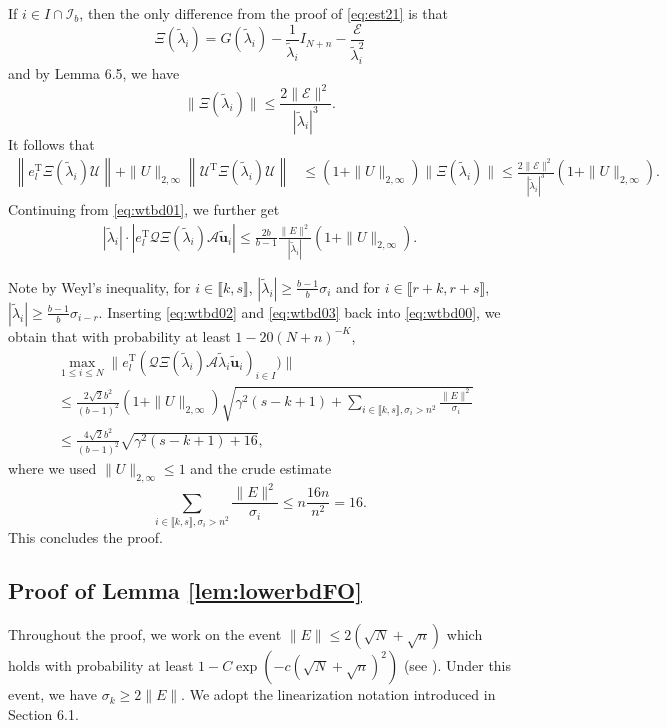 \documentclass[reqno]{amsart}
\newcommand{\T}{\mathrm{T}}
\theoremstyle{plain}
\theoremstyle{definition}
\begin{document}
If $i\in I \cap \mathcal I_b$, then the only difference from the proof of \eqref{eq:est21} is that $$\Xi(\widetilde \lambda_i)=G(\widetilde \lambda_i)-\frac{1}{\widetilde \lambda_i} I_{N+n}-\frac{\mathcal E}{\widetilde \lambda_i^2}$$ and by Lemma 6.5, we have 
$$\|\Xi(\widetilde \lambda_i)\| \le \frac{2\|\mathcal E\|^2 }{|\widetilde \lambda_i|^3}. $$
It follows that
\begin{align*}
\left\|e_l^\T  \Xi(\widetilde \lambda_i) \mathcal U \right\| + \|  U \|_{2,\infty} \left\|\mathcal U^\T \Xi(\widetilde \lambda_i) \mathcal U \right\| 
&\le (1+ \|  U \|_{2,\infty}) \|\Xi(\widetilde{\lambda}_i) \| \le \frac{2\|\mathcal E\|^2 }{|\widetilde{\lambda}_i|^3}(1+ \|  U \|_{2,\infty}).
\end{align*}
Continuing from \eqref{eq:wtbd01}, we further get
\begin{align}\label{eq:wtbd03}
|\widetilde \lambda_i | \cdot \left| e_l^\T \mathcal Q \Xi(\widetilde \lambda_i) \mathcal A \widetilde{\mathbf u}_i \right| \le \frac{2b}{b-1} \frac{\|E\|^2}{|\widetilde{\lambda}_i|}(1+ \|  U \|_{2,\infty}).
\end{align}

Note by Weyl's inequality, for $i\in \llbracket k, s \rrbracket$, $|\widetilde{\lambda}_i| \ge \frac{b-1}{b} \sigma_i$ and for $i\in \llbracket r+k, r+s\rrbracket$, $|\widetilde{\lambda}_i| \ge \frac{b-1}{b} \sigma_{i-r}$. Inserting \eqref{eq:wtbd02} and \eqref{eq:wtbd03} back into \eqref{eq:wtbd00}, we obtain that with probability at least $1-20(N+n)^{-K}$,
\begin{align*}
&\max_{1\le i \le N} \| e_l^\T (\mathcal Q \Xi(\widetilde \lambda_i) \mathcal A \widetilde \lambda_i \widetilde{\mathbf u}_i)_{i\in I})\| \\
&\le \frac{2\sqrt 2 b^2}{(b-1)^2} (1+ \|  U \|_{2,\infty}) \sqrt{\gamma^2(s-k+1) + \sum_{i\in \llbracket k, s\rrbracket,\sigma_i>n^2} \frac{\|E\|^2}{\sigma_i}}\\
&\le  \frac{4\sqrt 2 b^2}{(b-1)^2}  \sqrt{\gamma^2(s-k+1) + 16},
\end{align*}
where we used $ \|  U \|_{2,\infty}\le 1$ and the crude estimate
$$\sum_{i\in \llbracket k, s\rrbracket,\sigma_i>n^2} \frac{\|E\|^2}{\sigma_i} \le n \frac{16n}{n^2} =16.$$
This concludes the proof.


\subsection{Proof of Lemma \ref{lem:lowerbdFO}}\label{sec:prooflower}
Throughout the proof, we work on the event $\|E\|\le 2(\sqrt{N}+\sqrt{n})$ which holds with probability at least $1-C\exp(-c(\sqrt N + \sqrt n)^2)$ (see \cite[Proposition 2.4]{Vbook}). Under this event, we have $\sigma_k \ge 2\|E\|$. We adopt the linearization notation introduced in Section 6.1.
\end{document}
